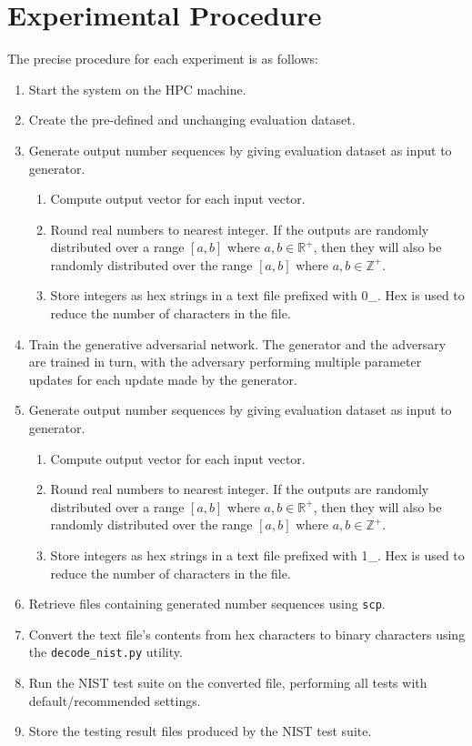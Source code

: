 \documentclass[12pt, titlepage]{report}
\theoremstyle{definition}
\begin{document}
\section{Experimental Procedure}
The precise procedure for each experiment is as follows:

\begin{enumerate}
    \itemsep0em
    \item Start the system on the HPC machine.
    \item Create the pre-defined and unchanging evaluation dataset.
    \item Generate output number sequences by giving evaluation dataset as input to generator.
    \begin{enumerate}
        \itemsep0em
        \item Compute output vector for each input vector.
        \item Round real numbers to nearest integer. If the outputs are randomly distributed over a range $[a,b]$ where $a,b \in \mathbb{R}^+$, then they will also be randomly distributed over the range $[a,b]$ where $a,b \in \mathbb{Z}^+$.
        \item Store integers as hex strings in a text file prefixed with 0\_. Hex is used to reduce the number of characters in the file.
    \end{enumerate}
    \item Train the generative adversarial network. The generator and the adversary are trained in turn, with the adversary performing multiple parameter updates for each update made by the generator.
    \item Generate output number sequences by giving evaluation dataset as input to generator.
    \begin{enumerate}
        \itemsep0em
        \item Compute output vector for each input vector.
        \item Round real numbers to nearest integer. If the outputs are randomly distributed over a range $[a,b]$ where $a,b \in \mathbb{R}^+$, then they will also be randomly distributed over the range $[a,b]$ where $a,b \in \mathbb{Z}^+$.
        \item Store integers as hex strings in a text file prefixed with 1\_. Hex is used to reduce the number of characters in the file.
    \end{enumerate}
    \item Retrieve files containing generated number sequences using \texttt{scp}.
    \item Convert the text file's contents from hex characters to binary characters using the \texttt{decode_nist.py} utility.
    \item Run the NIST test suite on the converted file, performing all tests with default/recommended settings.
    \item Store the testing result files produced by the NIST test suite.
\end{enumerate}
\end{document}
